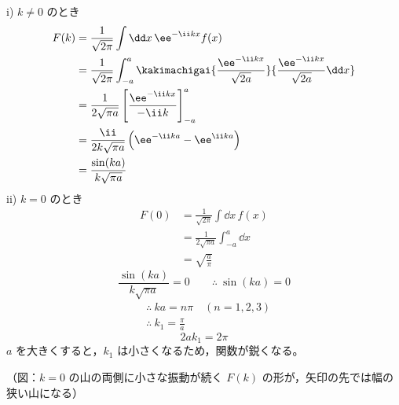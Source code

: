 i) $k\neq0$ のとき
\begin{align*}
F(k)&=\frac{1}{\sqrt{2\pi}}\int\dd x\,\ee^{-\ii kx}f(x)\\
&=\frac{1}{\sqrt{2\pi}}\int_{-a}^{a}\kakimachigai{\frac{\ee^{-\ii kx}}{\sqrt{2a}}}{\frac{\ee^{-\ii kx}}{\sqrt{2a}}\dd x}\\
&=\frac{1}{2\sqrt{\pi a}}\left[\frac{\ee^{-\ii kx}}{-\ii k}\right]_{-a}^{a}\\
&=\frac{\ii}{2k\sqrt{\pi a}}\left(\ee^{-\ii ka}-\ee^{\ii ka}\right)\\
&=\frac{\sin(ka)}{k\sqrt{\pi a}}
\end{align*}
ii) $k=0$ のとき
\begin{align*}
F(0)&=\frac{1}{\sqrt{2\pi}}\int\dd x\,f(x)\\
&=\frac{1}{2\sqrt{\pi a}}\int_{-a}^{a}\dd x\\
&=\sqrt{\frac{a}{\pi}}
\end{align*}
\[ \frac{\sin(ka)}{k\sqrt{\pi a}}=0\qquad\therefore\ \sin(ka)=0 \]
\begin{align*}
&\therefore\ ka=n\pi\quad(n=1,2,3)\\
&\therefore\ k_{1}=\frac{\pi}{a}
\end{align*}
\[ 2ak_{1}=2\pi \]
$a$ を大きくすると，$k_{1}$ は小さくなるため，関数が鋭くなる。

（図：$k=0$ の山の両側に小さな振動が続く $F(k)$ の形が，矢印の先では幅の狭い山になる）
